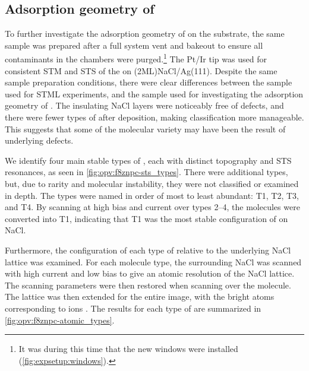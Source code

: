 \subsection{Adsorption geometry of }

To further investigate the adsorption geometry of  on the substrate, the same sample was prepared after a full system vent and bakeout to ensure all contaminants in the chambers were purged.\footnote{It was during this time that the new windows were installed (\autoref{fig:expsetup:windows}).} The Pt/Ir tip was used for consistent \ac{STM} and \ac{STS} of the  on (2ML)NaCl/Ag(111). Despite the same sample preparation conditions, there were clear differences between the sample used for \ac{STML} experiments, and the sample used for investigating the adsorption geometry of . The insulating NaCl layers were noticeably free of defects, and there were fewer types of  after deposition, making classification more manageable. This suggests that some of the molecular variety may have been the result of underlying defects. 




\begin{figure} [h]
    \centering
    \caption{}
    \label{fig:opv:f8znpc-sts_types}
\end{figure}

We identify four main stable types of , each with distinct topography and \ac{STS} resonances, as seen in \autoref{fig:opv:f8znpc-sts_types}. There were additional types, but, due to rarity and molecular instability, they were not classified or examined in depth. The types were named in order of most to least abundant: T1, T2, T3, and T4. By scanning at high bias and current over types 2--4, the molecules were converted into T1, indicating that T1 was the most stable configuration of  on NaCl. 

Furthermore, the configuration of each type of  relative to the underlying NaCl lattice was examined. For each molecule type, the surrounding NaCl was scanned with high current and low bias to give an atomic resolution of the NaCl lattice. The scanning parameters were then restored when scanning over the molecule. The lattice was then extended for the entire image, with the bright atoms corresponding to  ions \citep{heidorn2013influence}. The results for each type of  are summarized in \autoref{fig:opv:f8znpc-atomic_types}.

